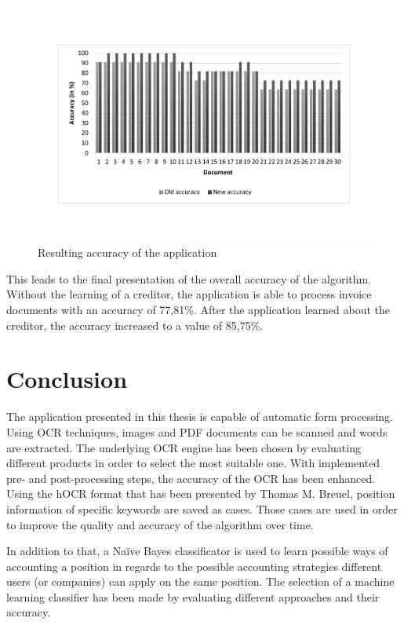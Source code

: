 \begin{figure}[ht!]
\centering
\includegraphics[width=\textwidth]{Images/Accuracy/Values2.pdf}
\caption{Resulting accuracy of the application \label{accuracyTable2}}
\end{figure}

This leads to the final presentation of the overall accuracy of the algorithm. Without the learning of a creditor, the application is able to process invoice documents with an accuracy of 77,81\%. After the application learned about the creditor, the accuracy increased to a value of 85,75\%.

\section{Conclusion}
\label{sec6.2}

The application presented in this thesis is capable of automatic form processing. Using OCR techniques, images and PDF documents can be scanned and words are extracted. The underlying OCR engine has been chosen by evaluating different products in order to select the most suitable one.
With implemented pre- and post-processing steps, the accuracy of the OCR has been enhanced. Using the hOCR format that has been presented by Thomas M. Breuel\cite{Breuel07}, position information of specific keywords are saved as cases. Those cases are used in order to improve the quality and accuracy of the algorithm over time. 

In addition to that, a Na{\"i}ve Bayes classificator is used to learn possible ways of accounting a position in regards to the possible accounting strategies different users (or companies) can apply on the same position. The selection of a machine learning classifier has been made by evaluating different approaches and their accuracy. 

